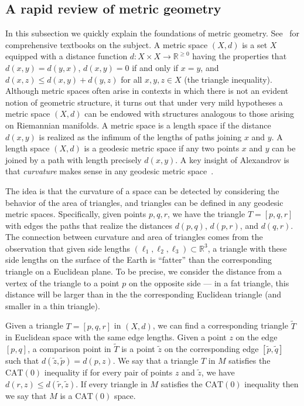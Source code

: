 \documentclass[a4paper,11pt]{article}
\newcommand{\CAT}{\textrm{CAT}}
\begin{document}
\subsection{A rapid review of metric geometry}

In this subsection we quickly explain the foundations of metric geometry.
See~\cite{bridson99, burago01} for comprehensive textbooks on the subject.
A metric space $(X,d)$ is a set $X$ equipped with a distance function $d \colon X \times X \to \mathbb{R}^{\geq 0}$ having the properties that $d(x,y) = d(y,x)$, $d(x,y) = 0$ if and only if $x = y$, and $d(x,z) \leq d(x,y) + d(y,z)$ for all $x,y,z \in X$ (the triangle inequality).
Although metric spaces often arise in contexts in which there is not an evident notion of geometric structure, it turns out that under very mild hypotheses a metric space $(X,d)$ can be endowed with structures analogous to those arising on Riemannian manifolds.
A metric space is a length space if the distance $d(x,y)$ is realized as the infimum of the lengths of paths joining $x$ and $y$.
A length space $(X,d)$ is a geodesic metric space if any two points $x$ and $y$ can be joined by a path with length precisely $d(x,y)$.
A key insight of Alexandrov is that {\em curvature} makes sense in any geodesic metric space~\cite{alexandrov1957uber}.

The idea is that the curvature of a space can be detected by considering the behavior of the area of triangles, and triangles can be defined in any geodesic metric spaces.
Specifically, given points $p, q, r$, we have the triangle $T = [p,q,r]$ with edges the paths that realize the distances $d(p,q)$, $d(p,r)$, and $d(q,r)$.
The connection between curvature and area of triangles comes from the observation that given side lengths $(\ell_1, \ell_2, \ell_3) \subset \mathbb{R}^3$, a triangle with these side lengths on the surface of the Earth is ``fatter'' than the corresponding triangle on a Euclidean plane.
To be precise, we consider the distance from a vertex of the triangle to a point $p$ on the opposite side --- in a fat triangle, this distance will be larger than in the the corresponding Euclidean triangle (and smaller in a thin triangle).

Given a triangle $T=[p,q,r]$ in $(X,d)$, we can find a corresponding triangle $\tilde{T}$ in Euclidean space with the same edge lengths.
Given a point $z$ on the edge $[p,q]$, a comparison point in $\tilde{T}$ is a point $\tilde{z}$ on the corresponding edge $[\tilde{p}, \tilde{q}]$ such that $d(\tilde{z}, \tilde{p}) = d(p,z)$.
We say that a triangle $T$ in $M$ satisfies the $\CAT(0)$ inequality if for every pair of points $z$ and $\tilde{z}$, we have $d(r,z) \leq d(\tilde{r},\tilde{z})$.
If every triangle in $M$ satisfies the $\CAT(0)$ inequality then we say that $M$ is a $\CAT(0)$ space.
\end{document}
